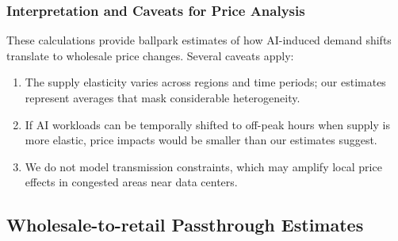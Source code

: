 \documentclass[a4paper,fleqn,longmktitle]{cas-sc}
\begin{document}
\subsubsection{Interpretation and Caveats for Price Analysis}\label{appendix:Caveats}

These calculations provide ballpark estimates of how AI-induced demand shifts translate to wholesale price changes. Several caveats apply:
\begin{enumerate}
    \item The supply elasticity varies across regions and time periods; our estimates represent averages that mask considerable heterogeneity.
    \item If AI workloads can be temporally shifted to off-peak hours when supply is more elastic, price impacts would be smaller than our estimates suggest.
    \item We do not model transmission constraints, which may amplify local price effects in congested areas near data centers.
\end{enumerate}

\subsection{Wholesale-to-retail Passthrough Estimates}\label{WholesaleRetailPassthrough}
\end{document}
